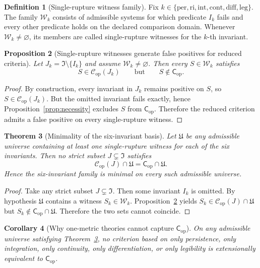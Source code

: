 \documentclass[11pt,a4paper]{article}
\newtheorem{theorem}{Theorem}[section]
\newtheorem{proposition}[theorem]{Proposition}
\newtheorem{corollary}[theorem]{Corollary}
\theoremstyle{definition}
\newtheorem{definition}[theorem]{Definition}
\newcommand{\Cop}{\mathsf{C}_{\mathrm{op}}}
\begin{document}
\begin{definition}[Single-rupture witness family]\label{def:witness}
Fix $k \in \{\mathrm{per},\mathrm{ri},\mathrm{int},\mathrm{cont},\mathrm{diff},\mathrm{leg}\}$. The family $\mathcal{W}_k$ consists of admissible systems for which predicate $I_k$ fails and every other predicate holds on the declared comparison domain. Whenever $\mathcal{W}_k \neq \varnothing$, its members are called single-rupture witnesses for the $k$-th invariant.
\end{definition}

\begin{proposition}[Single-rupture witnesses generate false positives for reduced criteria]\label{prop:witness}
Let $J_k = \mathfrak{I}\setminus\{I_k\}$ and assume $\mathcal{W}_k \neq \varnothing$. Then every $S \in \mathcal{W}_k$ satisfies
\[
S \in \mathcal{C}_{\mathrm{op}}(J_k)
\qquad\text{but}\qquad
S \notin \Cop.
\]
\end{proposition}

\begin{proof}
By construction, every invariant in $J_k$ remains positive on $S$, so $S \in \mathcal{C}_{\mathrm{op}}(J_k)$. But the omitted invariant fails exactly, hence Proposition~\ref{prop:necessity} excludes $S$ from $\Cop$. Therefore the reduced criterion admits a false positive on every single-rupture witness.
\end{proof}

\begin{theorem}[Minimality of the six-invariant basis]\label{thm:minimality}
Let $\mathfrak{U}$ be any admissible universe containing at least one single-rupture witness for each of the six invariants. Then no strict subset $J \subsetneq \mathfrak{I}$ satisfies
\[
\mathcal{C}_{\mathrm{op}}(J) \cap \mathfrak{U} = \Cop \cap \mathfrak{U}.
\]
Hence the six-invariant family is minimal on every such admissible universe.
\end{theorem}

\begin{proof}
Take any strict subset $J \subsetneq \mathfrak{I}$. Then some invariant $I_k$ is omitted. By hypothesis $\mathfrak{U}$ contains a witness $S_k \in \mathcal{W}_k$. Proposition~\ref{prop:witness} yields $S_k \in \mathcal{C}_{\mathrm{op}}(J) \cap \mathfrak{U}$ but $S_k \notin \Cop \cap \mathfrak{U}$. Therefore the two sets cannot coincide.
\end{proof}

\begin{corollary}[Why one-metric theories cannot capture $\Cop$]\label{cor:onemetric}
On any admissible universe satisfying Theorem~\ref{thm:minimality}, no criterion based on only persistence, only integration, only continuity, only differentiation, or only legibility is extensionally equivalent to $\Cop$.
\end{corollary}
\end{document}
